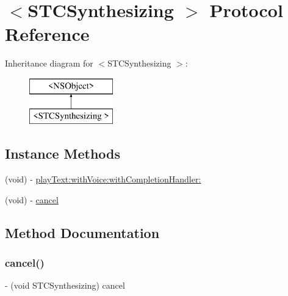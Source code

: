 \hypertarget{protocol_s_t_c_synthesizing_01-p}{}\section{$<$S\+T\+C\+Synthesizing $>$ Protocol Reference}
\label{protocol_s_t_c_synthesizing_01-p}
Inheritance diagram for $<$S\+T\+C\+Synthesizing $>$\+:\begin{figure}[H]
\begin{center}
\leavevmode
\includegraphics[height=2.000000cm]{protocol_s_t_c_synthesizing_01-p}
\end{center}
\end{figure}
\subsection*{Instance Methods}
\begin{DoxyCompactItemize}
\item 
(void) -\/ \hyperlink{protocol_s_t_c_synthesizing_01-p_a58e75a03797c1670f9b819187815cbe6}{play\+Text\+:with\+Voice\+:with\+Completion\+Handler\+:}
\item 
(void) -\/ \hyperlink{protocol_s_t_c_synthesizing_01-p_accfe88d8ac59aaa519fcbddfa0608698}{cancel}
\end{DoxyCompactItemize}


\subsection{Method Documentation}
\hypertarget{protocol_s_t_c_synthesizing_01-p_accfe88d8ac59aaa519fcbddfa0608698}{}\label{protocol_s_t_c_synthesizing_01-p_accfe88d8ac59aaa519fcbddfa0608698} 
\subsubsection{\texorpdfstring{cancel()}{cancel()}}
{\footnotesize\ttfamily -\/ (void S\+T\+C\+Synthesizing) cancel \begin{DoxyParamCaption}{ }\end{DoxyParamCaption}}

